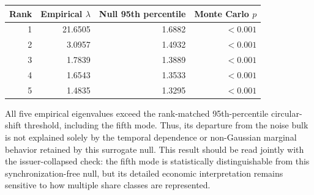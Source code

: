 \begin{center}
\label{tab:rmt_circular_shift_null}
\begin{tabular}{rrrr}
\toprule
Rank & Empirical $\lambda$ & Null 95th percentile & Monte Carlo $p$ \\
\midrule
1 & 21.6505 & 1.6882 & $<0.001$ \\
2 & 3.0957 & 1.4932 & $<0.001$ \\
3 & 1.7839 & 1.3889 & $<0.001$ \\
4 & 1.6543 & 1.3533 & $<0.001$ \\
5 & 1.4835 & 1.3295 & $<0.001$ \\
\bottomrule
\end{tabular}
\end{center}

All five empirical eigenvalues exceed the rank-matched 95th-percentile circular-shift threshold, including the fifth mode. Thus, its departure from the noise bulk is not explained solely by the temporal dependence or non-Gaussian marginal behavior retained by this surrogate null. This result should be read jointly with the issuer-collapsed check: the fifth mode is statistically distinguishable from this synchronization-free null, but its detailed economic interpretation remains sensitive to how multiple share classes are represented.
